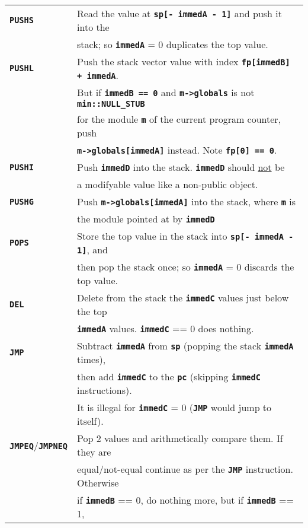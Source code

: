 \documentclass[12pt]{article}
\makeatletter
\newcommand{\TT}[1]{{\tt \bfseries #1}}
\newcommand{\ttkey}[1]{\TT{#1}\index{#1@{\tt #1}}}
\newlength{\figurewidth}
\newenvironment{boxedfigure}[1][!btp]%
	{\begin{figure*}[#1]
	 \begin{lrbox}{\figurebox}
	 \begin{minipage}{\figurewidth}

	 \vspace*{1ex}}%
	{
	 \vspace*{1ex}

	 \end{minipage}
	 \end{lrbox}

	 \centering
	 \fbox{\hspace*{0.1in}\usebox{\figurebox}\hspace*{0.1in}}
	 \end{figure*}}
\makeatother
\begin{document}
\begin{boxedfigure}

\begin{center}
\begin{tabular}{|l|l|}
\hline
\ttkey{PUSHS}
    & Read the value at \TT{sp[- immedA - 1]} and push it into the \\
    & stack; so \TT{immedA} = 0 duplicates the top value.
\\\hline
\ttkey{PUSHL}
    & Push the stack vector value with index \TT{fp[immedB] + immedA}. \\
    & But if \TT{immedB == 0} and \TT{m->globals} is not \TT{min::NULL\_STUB} \\
    & for the module \TT{m} of the current program counter, push \\
    & \TT{m->globals[immedA]} instead.  Note \TT{fp[0] == 0}.
\\\hline
\ttkey{PUSHI}
    & Push \TT{immedD} into the stack.  \TT{immedD} should \underline{not} be \\
    & a modifyable value like a non-public object.
\\\hline
\ttkey{PUSHG}
    & Push \TT{m->globals[immedA]} into the stack, where \TT{m} is \\
    & the module pointed at by \TT{immedD}
\\\hline
\ttkey{POPS}
    & Store the top value in the stack into \TT{sp[- immedA - 1]}, and \\
    & then pop the stack once; so \TT{immedA} = 0 discards the top value.
\\\hline
\ttkey{DEL}
    & Delete from the stack the \TT{immedC} values just below the top \\
    & \TT{immedA} values.  \TT{immedC} == 0 does nothing.
\\\hline
\ttkey{JMP}
    & Subtract \TT{immedA} from \TT{sp} (popping the stack \TT{immedA} times),
      \\
    & then add \TT{immedC} to the \TT{pc} (skipping \TT{immedC} instructions).
      \\
    & It is illegal for \TT{immedC} = 0 (\TT{JMP} would jump to itself).
\\\hline
\ttkey{JMPEQ}/\ttkey{JMPNEQ}
    & Pop 2 values and arithmetically compare them.  If they are \\
    & equal/not-equal continue as per the \TT{JMP} instruction.  Otherwise \\
    & if \TT{immedB} == 0, do nothing more, but if \TT{immedB} == 1, \\

\end{tabular}
\end{center}
\end{boxedfigure}
\end{document}
